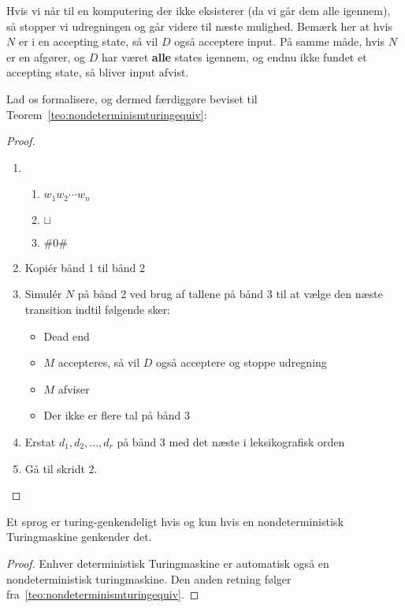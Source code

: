 Hvis vi når til en komputering der ikke eksisterer (da vi går dem alle igennem), så stopper vi udregningen og går videre til næste mulighed.
Bemærk her at hvis $N$ er i en accepting state, så vil $D$ også acceptere input. På samme måde, hvis $N$ er en afgører, og $D$ har været \textbf{alle} states igennem, og endnu ikke fundet et accepting state, så bliver input afvist.

Lad os formalisere, og dermed færdiggøre beviset til Teorem~\ref{teo:nondeterminismturingequiv}:

\begin{proof}
	\begin{enumerate}
		\item \begin{enumerate}
			      \item $w_{1}w_{2}\cdots w_{n}$
			      \item $\sqcup$
			      \item $\#0\#$
		      \end{enumerate}
		\item Kopiér bånd 1 til bånd 2
		\item Simulér $N$ på bånd 2 ved brug af tallene på bånd 3 til at vælge den næste transition indtil følgende sker:
		      \begin{itemize}
			      \item Dead end
			      \item $M$ accepteres, så vil $D$ også acceptere og stoppe udregning
			      \item $M$ afviser
			      \item Der ikke er flere tal på bånd 3
		      \end{itemize}
		\item Erstat $d_{1},d_{2},\ldots, d_{r}$ på bånd 3 med det næste i leksikografisk orden
		\item Gå til skridt 2.
	\end{enumerate}
\end{proof}


\begin{corollary}
	Et sprog er turing-genkendeligt hvis og kun hvis en nondeterministisk Turingmaskine genkender det.
\end{corollary}

\begin{proof}
	Enhver deterministisk Turingmaskine er automatisk også en nondeterministisk turingmaskine. Den anden retning følger fra~\ref{teo:nondeterminismturingequiv}.
\end{proof}

